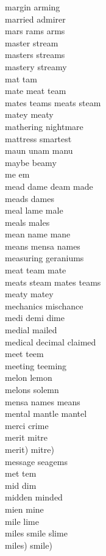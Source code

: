 margin arming\\
married admirer\\
mars rams arms\\
master stream\\
masters streams\\
mastery streamy\\
mat tam\\
mate meat team\\
mates teams meats steam\\
matey meaty\\
mathering nightmare\\
mattress smartest\\
maun unam manu\\
maybe beamy\\
me em\\
mead dame deam made\\
meads dames\\
meal lame male\\
meals males\\
mean name mane\\
means mensa names\\
measuring geraniums\\
meat team mate\\
meats steam mates teams\\
meaty matey\\
mechanics mischance\\
medi demi dime\\
medial mailed\\
medical decimal claimed\\
meet teem\\
meeting teeming\\
melon lemon\\
melons solemn\\
mensa names means\\
mental mantle mantel\\
merci crime\\
merit mitre\\
merit) mitre)\\
message seagems\\
met tem\\
mid dim\\
midden minded\\
mien mine\\
mile lime\\
miles smile slime\\
miles) smile)\\

